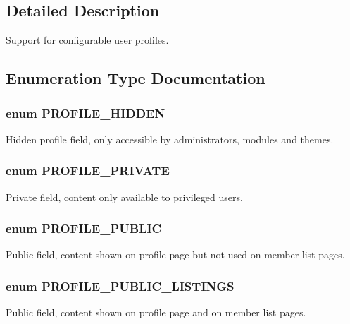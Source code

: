 \subsection{Detailed Description}
Support for configurable user profiles. 

\subsection{Enumeration Type Documentation}
\hypertarget{profile_8module_aa0cce9439e7000486ab39f1602fdd8ec}{
\subsubsection[{PROFILE\_\-HIDDEN}]{\setlength{\rightskip}{0pt plus 5cm}enum {\bf PROFILE\_\-HIDDEN}}}
\label{profile_8module_aa0cce9439e7000486ab39f1602fdd8ec}
Hidden profile field, only accessible by administrators, modules and themes. \hypertarget{profile_8module_a716a6e53d21c86799f2b81235a94e42e}{
\subsubsection[{PROFILE\_\-PRIVATE}]{\setlength{\rightskip}{0pt plus 5cm}enum {\bf PROFILE\_\-PRIVATE}}}
\label{profile_8module_a716a6e53d21c86799f2b81235a94e42e}
Private field, content only available to privileged users. \hypertarget{profile_8module_ad05d09d0c6e6c43a423e51496f4435fd}{
\subsubsection[{PROFILE\_\-PUBLIC}]{\setlength{\rightskip}{0pt plus 5cm}enum {\bf PROFILE\_\-PUBLIC}}}
\label{profile_8module_ad05d09d0c6e6c43a423e51496f4435fd}
Public field, content shown on profile page but not used on member list pages. \hypertarget{profile_8module_a446618b936db915449e9bba63330ccd8}{
\subsubsection[{PROFILE\_\-PUBLIC\_\-LISTINGS}]{\setlength{\rightskip}{0pt plus 5cm}enum {\bf PROFILE\_\-PUBLIC\_\-LISTINGS}}}
\label{profile_8module_a446618b936db915449e9bba63330ccd8}
Public field, content shown on profile page and on member list pages. 

